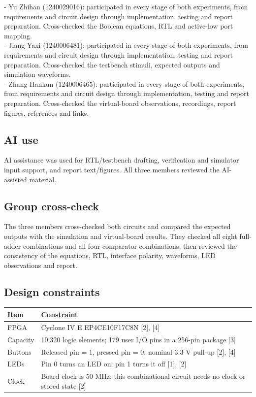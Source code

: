 \documentclass[10pt,a4paper]{article}
\begin{document}
- Yu Zhihan (1240029016): participated in every stage of both experiments, from requirements and circuit design through implementation, testing and report preparation. Cross-checked the Boolean equations, RTL and active-low port mapping.\\
- Jiang Yaxi (1240006481): participated in every stage of both experiments, from requirements and circuit design through implementation, testing and report preparation. Cross-checked the testbench stimuli, expected outputs and simulation waveforms.\\
- Zhang Hankun (1240006465): participated in every stage of both experiments, from requirements and circuit design through implementation, testing and report preparation. Cross-checked the virtual-board observations, recordings, report figures, references and links.\par

\subsection*{AI use}

AI assistance was used for RTL/testbench drafting, verification and simulator input support, and report text/figures. All three members reviewed the AI-assisted material.\par

\subsection*{Group cross-check}

The three members cross-checked both circuits and compared the expected outputs with the simulation and virtual-board results. They checked all eight full-adder combinations and all four comparator combinations, then reviewed the consistency of the equations, RTL, interface polarity, waveforms, LED observations and report.\par

\subsection*{Design constraints}

\begingroup\small\setlength{\tabcolsep}{4pt}
\renewcommand{\arraystretch}{1.20}
\noindent\begin{tabular}{@{}p{}p{}@{}}
\toprule
\textbf{Item} & \textbf{Constraint} \\
\midrule
FPGA & Cyclone IV E EP4CE10F17C8N [2], [4] \\
Capacity & 10,320 logic elements; 179 user I/O pins in a 256-pin package [3] \\
Buttons & Released pin = 1, pressed pin = 0; nominal 3.3 V pull-up [2], [4] \\
LEDs & Pin 0 turns an LED on; pin 1 turns it off [1], [2] \\
Clock & Board clock is 50 MHz; this combinational circuit needs no clock or stored state [2] \\
\bottomrule
\end{tabular}\par\endgroup
\vspace{2mm}
\end{document}
